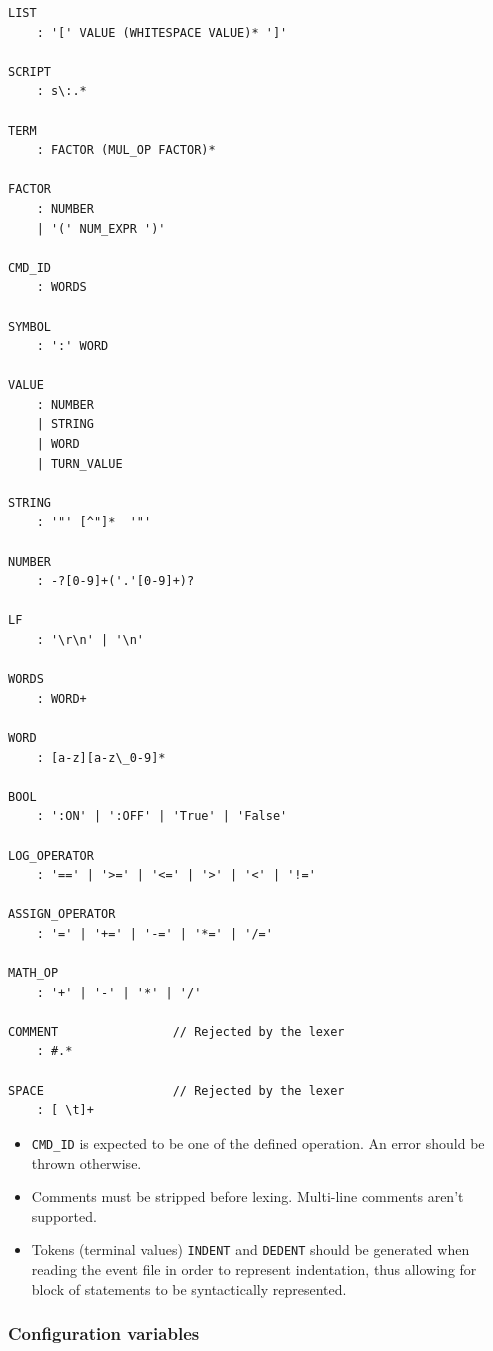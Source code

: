 \documentclass[11pt]{article}
\begin{document}
\newpage
\begin{Verbatim}[frame=single, fontsize=\footnotesize]
LIST
    : '[' VALUE (WHITESPACE VALUE)* ']'

SCRIPT
    : s\:.*

TERM
    : FACTOR (MUL_OP FACTOR)*

FACTOR
    : NUMBER
    | '(' NUM_EXPR ')'

CMD_ID
    : WORDS
    
SYMBOL
    : ':' WORD
    
VALUE
    : NUMBER
    | STRING
    | WORD
    | TURN_VALUE
    
STRING
    : '"' [^"]*  '"'

NUMBER
    : -?[0-9]+('.'[0-9]+)?

LF
    : '\r\n' | '\n'
    
WORDS
    : WORD+
    
WORD
    : [a-z][a-z\_0-9]*
    
BOOL
    : ':ON' | ':OFF' | 'True' | 'False'
    
LOG_OPERATOR
    : '==' | '>=' | '<=' | '>' | '<' | '!='
    
ASSIGN_OPERATOR
    : '=' | '+=' | '-=' | '*=' | '/='
    
MATH_OP
    : '+' | '-' | '*' | '/'
    
COMMENT                // Rejected by the lexer
    : #.*
    
SPACE                  // Rejected by the lexer
    : [ \t]+
\end{Verbatim}

\begin{itemize}
	\item \verb|CMD_ID| is expected to be one of the defined operation. An error should be thrown otherwise.
	
	\item Comments must be stripped before lexing. Multi-line comments aren't supported.
	
	\item Tokens (terminal values) \verb|INDENT| and \verb|DEDENT| should be generated when reading the event file in order to represent indentation, thus allowing for block of statements to be syntactically represented.
	
\end{itemize}

\subsubsection{Configuration variables}
\end{document}
